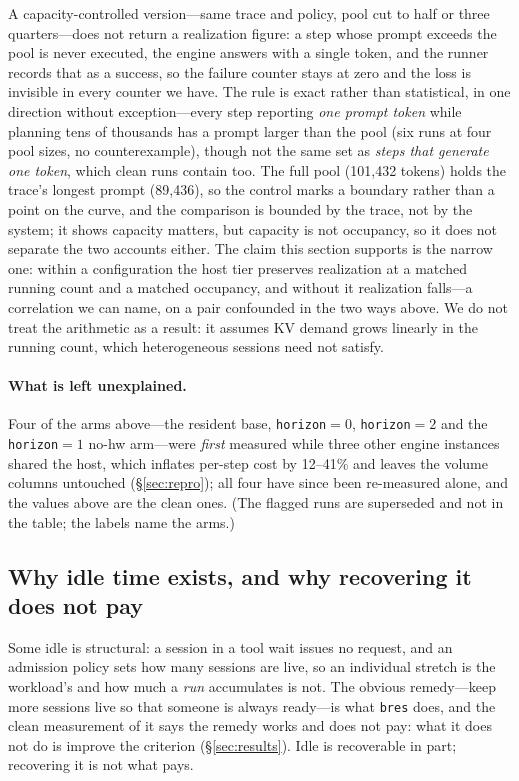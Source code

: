 A capacity-controlled version---same trace and policy, pool cut to half or three
quarters---does not return a realization figure: a step whose prompt exceeds the
pool is never executed, the engine answers with a single token, and the runner
records that as a success, so the failure counter stays at zero and the loss is
invisible in every counter we have. The rule is exact rather than statistical, in
one direction without exception---every step reporting \emph{one prompt token}
while planning tens of thousands has a prompt larger than the pool (six runs at
four pool sizes, no counterexample), though not the same set as \emph{steps that
generate one token}, which clean runs contain too. The full pool (101{,}432 tokens)
holds the trace's longest prompt (89{,}436), so the control marks a boundary rather
than a point on the curve, and the comparison is bounded by the trace, not by the
system; it shows capacity matters, but capacity is not occupancy, so it does not
separate the two accounts either. The claim this section supports is
the narrow one: within a configuration the host tier preserves realization at a
matched running count and a matched occupancy, and without it realization
falls---a correlation we can name, on a pair confounded in the two ways above. We
do not treat the arithmetic as a result: it assumes KV demand grows linearly in the
running count, which heterogeneous sessions need not satisfy.

\paragraph{What is left unexplained.} Four of the arms above---the resident base,
\texttt{horizon}$=0$, \texttt{horizon}$=2$ and the \texttt{horizon}$=1$ no-hw
arm---were \emph{first} measured while three other engine instances shared the host,
which inflates per-step cost by 12--41\% and leaves the volume columns untouched
(\S\ref{sec:repro}); all four have since been re-measured alone, and the values
above are the clean ones. (The flagged runs are superseded and not in the table;
the labels name the arms.)

\subsection{Why idle time exists, and why recovering it does not pay}

Some idle is structural: a session in a tool wait issues no request, and an
admission policy sets how many sessions are live, so an individual stretch is the
workload's and how much a \emph{run} accumulates is not.
The obvious remedy---keep more sessions live so that someone is always ready---is
what \texttt{bres} does, and the clean measurement of it says the remedy works and
does not pay: what it does not do is improve the criterion (\S\ref{sec:results}).
Idle is recoverable in part; recovering it is not what pays.
